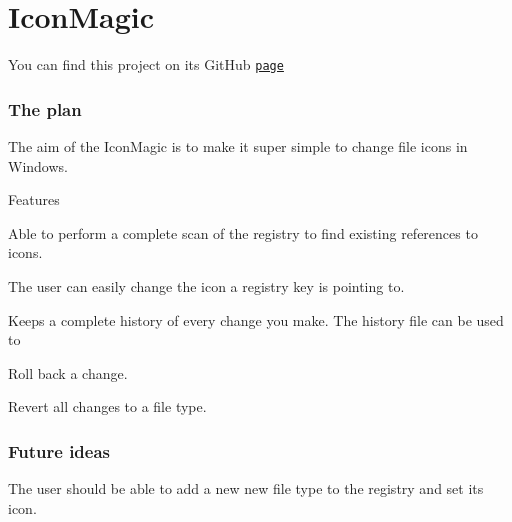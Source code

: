 \section*{Icon\+Magic}

You can find this project on its Git\+Hub \href{https://github.com/ThetaSinner/IconMagic}{\tt page}

\subsubsection*{The plan}

The aim of the Icon\+Magic is to make it super simple to change file icons in Windows.

Features
\begin{DoxyItemize}
\item Able to perform a complete scan of the registry to find existing references to icons.
\item The user can easily change the icon a registry key is pointing to.
\item Keeps a complete history of every change you make. The history file can be used to
\begin{DoxyItemize}
\item Roll back a change.
\item Revert all changes to a file type.
\end{DoxyItemize}
\end{DoxyItemize}

\subsubsection*{Future ideas}


\begin{DoxyItemize}
\item The user should be able to add a new new file type to the registry and set its icon. 
\end{DoxyItemize}